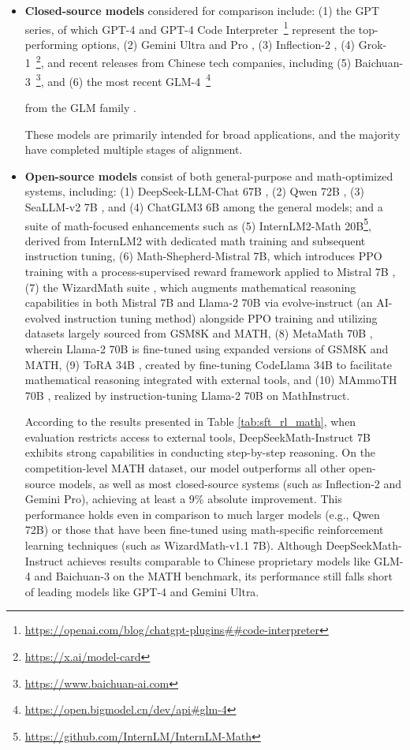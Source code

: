\begin{itemize}[topsep=0pt]
\begin{itemize}[topsep=0pt]
    \item \textbf{Closed-source models} considered for comparison include: (1) the GPT series, of which GPT-4 \citep{gpt4} and GPT-4 Code Interpreter~\footnote{\url{https://openai.com/blog/chatgpt-plugins\#\#code-interpreter}} represent the top-performing options, (2) Gemini Ultra and Pro \citep{gemini}, (3) Inflection-2 \citep{inflection-2}, (4) Grok-1~\footnote{\url{https://x.ai/model-card}}, and recent releases from Chinese tech companies, including (5) Baichuan-3~\footnote{\url{https://www.baichuan-ai.com}}, and (6) the most recent GLM-4~\footnote{\url{https://open.bigmodel.cn/dev/api\#glm-4}}

    from the GLM family \citep{glm}.

These models are primarily intended for broad applications, and the majority have completed multiple stages of alignment.

\item \textbf{Open-source models} consist of both general-purpose and math-optimized systems, including: (1) DeepSeek-LLM-Chat 67B \citep{deepseek-llm}, (2) Qwen 72B \citep{qwen}, (3) SeaLLM-v2 7B \citep{seallm}, and (4) ChatGLM3 6B \citep{chatglm3} among the general models; and a suite of math-focused enhancements such as (5) InternLM2-Math 20B\footnote{\url{https://github.com/InternLM/InternLM-Math}}, derived from InternLM2 with dedicated math training and subsequent instruction tuning, (6) Math-Shepherd-Mistral 7B, which introduces PPO training \citep{schulman2017proximal} with a process-supervised reward framework applied to Mistral 7B \citep{mistral}, (7) the WizardMath suite \citep{wizardmath}, which augments mathematical reasoning capabilities in both Mistral 7B and Llama-2 70B \citep{llama2} via evolve-instruct (an AI-evolved instruction tuning method) alongside PPO training and utilizing datasets largely sourced from GSM8K and MATH, (8) MetaMath 70B \citep{metamath}, wherein Llama-2 70B is fine-tuned using expanded versions of GSM8K and MATH, (9) ToRA 34B \cite{tora}, created by fine-tuning CodeLlama 34B to facilitate mathematical reasoning integrated with external tools, and (10) MAmmoTH 70B \citep{MathInstruct}, realized by instruction-tuning Llama-2 70B on MathInstruct.

According to the results presented in Table \ref{tab:sft_rl_math}, when evaluation restricts access to external tools, DeepSeekMath-Instruct 7B exhibits strong capabilities in conducting step-by-step reasoning. On the competition-level MATH dataset, our model outperforms all other open-source models, as well as most closed-source systems (such as Inflection-2 and Gemini Pro), achieving at least a 9\% absolute improvement. This performance holds even in comparison to much larger models (e.g., Qwen 72B) or those that have been fine-tuned using math-specific reinforcement learning techniques (such as WizardMath-v1.1 7B). Although DeepSeekMath-Instruct achieves results comparable to Chinese proprietary models like GLM-4 and Baichuan-3 on the MATH benchmark, its performance still falls short of leading models like GPT-4 and Gemini Ultra.


\end{itemize}
\end{itemize}
